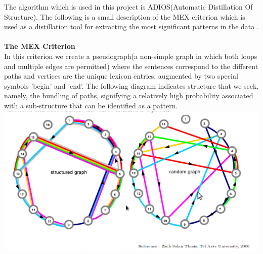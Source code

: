 \def\DevnagVersion{2.15}\documentclass[14 pt]{article}
\begin{document}
The algorithm which is used in this project is ADIOS(Automatic Distillation Of Structure).
The following is a small description of the MEX criterion which is used as a distillation tool for extracting the most significant patterns in the data .\\ \\
{\large \bf The MEX Criterion}
\\
In this criterion we create a pseudograph(a non-simple graph in which both loops and multiple edges are permitted) where the sentences correspond to the different paths and vertices are the unique lexicon entries, augmented by two special symbols 'begin' and 'end'. The following diagram indicates structure that we seek, namely, the bundling of paths, signifying a relatively high probability associated with a sub-structure that can be identified as a pattern.\\
\includegraphics[width=15cm]{graph.png}
	   
\end{document}
